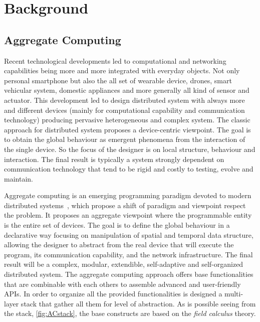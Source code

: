 \chapter{Background}
\label{chap:background}


\section{Aggregate Computing}
Recent technological developments led to computational and networking capabilities being more and more integrated with everyday objects. 
% 
Not only personal smartphone but also the all set of wearable device, drones, smart vehicular system, domestic appliances and more generally all kind of sensor and actuator.
% 
This development led to design distributed system with always more and different devices (mainly for computational capability and communication technology) producing pervasive heterogeneous and complex system.
% 
The classic approach for distributed system proposes a device-centric viewpoint.
% 
The goal is to obtain the global behaviour as emergent phenomena from the interaction of the single device. 
% 
So the focus of the designer is on local structure, behaviour and interaction. 
% 
The final result is typically a system strongly dependent on communication technology that tend to be rigid and costly to testing, evolve and maintain.
 
Aggregate computing is an emerging programming paradigm devoted to modern distributed systems~\cite{BealIEEEComputer2015}, which propose a shift of paradigm and viewpoint respect the problem. 
% 
It proposes an aggregate viewpoint where the programmable entity is the entire set of devices.
% 
The goal is to define the global behaviour in a declarative way focusing on manipulation of spatial and temporal data structure, allowing the designer to abstract from the real device that will execute the program, its communication capability, and the network infrastructure. 
% 
The final result will be a complex, modular, extendible, self-adaptive and self-organized distributed system.
% 
The aggregate computing approach offers base functionalities that are combinable with each others to assemble advanced and user-friendly APIs. In order to organize all the provided functionalities is designed a multi-layer stack that gather all them for level of abstraction. 
As is possible seeing from the stack, \autoref{fig:ACstack}, the base constructs are based on the \textit{field calculus} theory.

